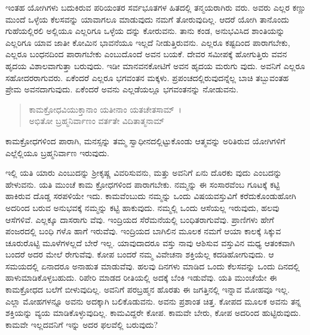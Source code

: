 ಇಂತಹ ಯೋಗಿಗಳು ಬದುಕಿರುವ ಪರಿಯಂತರ ಸರ್ವಭೂತಗಳ ಹಿತದಲ್ಲಿ ತನ್ಮಯರಾಗಿರು ವರು. ಅವರು ಎಲ್ಲರ ಕಣ್ಣು ಮುಂದೆ ಒಳ್ಳೆಯ ಕೆಲಸವನ್ನು ಯಾವಾಗಲೂ ಮಾಡುವುದು ನಮಗೆ ತೋರುವುದಿಲ್ಲ. ಆದರೆ ಯೋಗಿ ತಾನೊಂದು ಗುಹೆಯಲ್ಲಿರಲಿ ಅಲ್ಲಿಯೂ ಎಲ್ಲರಿಗೂ ಒಳ್ಳೆಯ ದನ್ನು ಕೋರುವನು. ತಾನು ಕಂಡ, ಅನುಭವಿಸಿದ ಶಾಂತಿಯನ್ನು ಎಲ್ಲರಿಗೂ ಯಾವ ಜಾತೀ ಕೋಮಿನ ಭಾವನೆಯೂ ಇಲ್ಲದೆ ನೀಡುತ್ತಿರುವನು. ಎಲ್ಲರೂ ಕಷ್ಟದಿಂದ ಪಾರಾಗಬೇಕು, ಎಲ್ಲರೂ ಬಂಧನದಿಂದ ಪಾರಾಗಬೇಕು ಎಂಬುದೊಂದೆ ಅವನ ಬಯಕೆ. ದೇವರ ಸಮೀಪಕ್ಕೆ ಹೋಗುತ್ತಿರು ವವನ ಹೃದಯ ವಿಶಾಲವಾಗುತ್ತಾ ಬರುವುದು. ಇಡೀ ಮಾನವನಕೋಟಿಗೆ ಅವನ ಹೃದಯ ಮರುಗು ವುದು. ಅವನಿಗೆ ಎಲ್ಲರೂ ಸಹೋದರರಾಗುವರು. ಏಕೆಂದರೆ ಎಲ್ಲರೂ ಭಗವಂತನ ಮಕ್ಕಳು. ಪ್ರಪಂಚದಲ್ಲಿರುವುದನ್ನೆಲ್ಲ ಬಾಚಿ ತಬ್ಬುವಂತಹ ಪ್ರೇಮ ಅವನದಾಗುವುದು. ಏಕೆಂದರೆ ಅವನು ಎಲ್ಲಡೆಯಲ್ಲೂ ಭಗವಂತನನ್ನು ನೋಡುವನು.

\begin{verse}
ಕಾಮಕ್ರೋಧವಿಯುಕ್ತಾನಾಂ ಯತೀನಾಂ ಯತಚೇತಸಾಮ್~।\\ಅಭಿತೋ ಬ್ರಹ್ಮನಿರ್ವಾಣಂ ವರ್ತತೇ ವಿದಿತಾತ್ಮನಾಮ್ 
\end{verse}

{\small ಕಾಮಕ್ರೋಧಗಳಿಂದ ಪಾರಾಗಿ, ಮನಸ್ಸನ್ನು ತಮ್ಮ ಸ್ವಾಧೀನದಲ್ಲಿಟ್ಟುಕೊಂಡು ಆತ್ಮವನ್ನು ಅರಿತಿರುವ ಯೋಗಿಗಳಿಗೆ ಎಲ್ಲೆಲ್ಲಿಯೂ ಬ್ರಹ್ಮನಿರ್ವಾಣ ಇರುವುದು.}

ಇಲ್ಲಿ ಯತಿ ಯಾರು ಎಂಬುದನ್ನು ಶ‍್ರೀಕೃಷ್ಣ ವಿವರಿಸುವನು, ಮತ್ತು ಅವನಿಗೆ ಏನು ದೊರಕು ವುದು ಎಂಬದನ್ನು ಹೇಳುವನು. ಯತಿ ಮುಂಚೆ ಕಾಮ ಕ್ರೋಧಗಳಿಂದ ಪಾರಾಗಬೇಕು. ನಮ್ಮನ್ನು ಈ ಸಂಸಾರವೆಂಬ ಗೂಟಕ್ಕೆ ಕಟ್ಟಿ ಹಾಕಿರುವ ದೊಡ್ಡ ಸರಪಳಿಯೇ ಇದು. ಕಾಮವೆಂಬುದು ನಮ್ಮನ್ನು ಒಂದು ವಿಷಯವಸ್ತುವಿಗೆ ಕರೆದುಕೊಂಡುಹೋಗಿ ಅದರಿಂದ ಬರುವ ಅನುಭವಕ್ಕೆ ನಮ್ಮನ್ನು ಕಟ್ಟಿ ಹಾಕುವುದು. ನಮ್ಮಲ್ಲಿ ಒಂದು ಆಸೆಯಲ್ಲ ಇರುವುದು, ಹಲವು ಆಸೆಗಳಿವೆ. ಎಲ್ಲಕ್ಕೂ ದಾಸರಾಗು ವೆವು. ಇಂದ್ರಿಯದ ಸೆರೆಮನೆಯಲ್ಲಿ ಬಂಧಿತರಾಗುವೆವು. ಪ್ರಾಣಿಗಳು ಹೇಗೆ ಪಂಜರದಲ್ಲಿ ಬಂಧಿ ಗಳೊ ಹಾಗೆ ಇರುವೆವು. ಇಂದ್ರಿಯದ ಬಾಗಿಲಿನ ಮೂಲಕ ನಮಗೆ ಆಯಾ ಕಾಲಕ್ಕೆ ಸಿಕ್ಕುವ ಚೂರುರೊಟ್ಟಿ ಮೂಳೆಗಳಲ್ಲದೆ ಬೇರೆ ಇಲ್ಲ. ಯಾವುದಾದರೂ ವಸ್ತು ನಾವು ಆಶಿಸುವ ವಸ್ತುವಿನ ಮಧ್ಯ ಆತಂಕವಾಗಿ ಬಂದರೆ ಅದರ ಮೇಲೆ ರೇಗುವೆವು. ಕೋಪ ಬಂದರೆ ನಮ್ಮ ವಿವೇಚನಾ ಶಕ್ತಿಯೆಲ್ಲ ಕದಡಿಹೋಗುವುದು. ಆ ಸಮಯದಲ್ಲಿ ಏನಾದರೂ ಅನಾಹುತ ಮಾಡುವೆವು. ಹಲವು ದಿನಗಳು ಮಾಡಿದ ಒಂದು ಕೆಲಸವನ್ನು ಒಂದು ದಿನದಲ್ಲಿ ಹಾಳುಮಾಡಿಕೊಳ್ಳಬಹುದು. ರಿಪೇರಿ ಮಾಡದ ರೀತಿಯಲ್ಲಿ ಅದಕ್ಕೆ ಬೆಂಕಿ ಇಡುವೆವು. ಯತಿ ಮುಂಚೆಯೇ ಈ ಕಾಮಕ್ರೋಧದ ಬಲೆಗೆ ಬೀಳುವುದಿಲ್ಲ. ಅವನಿಗೆ ಪರಬ್ರಹ್ಮನ ಹೊರತು ಈ ಜಗತ್ತಿನಲ್ಲಿ ಇನ್ನಾವ ಮೋಹವೂ ಇಲ್ಲ. ಎಲ್ಲಾ ಮೋಹಗಳನ್ನೂ ಅವನು ಅದಕ್ಕಾಗಿ ಬಲಿಕೊಡುವನು. ಅವನು ಪ್ರಶಾಂತ ಚಿತ್ತ. ಕೋಪದ ಮೂಲಕ ಅವನು ತನ್ನ ಶಕ್ತಿಯನ್ನು ವ್ಯಯ ಮಾಡಿಕೊಳ್ಳುವುದಿಲ್ಲ. ಕಾಮವಿದ್ದರೇ ಕೋಪ. ಕಾಮವೇ ಬೇರು, ಕೋಪ ಅದರಿಂದ ಹುಟ್ಟಿರುವುದು. ಕಾಮವೇ ಇಲ್ಲದವನಿಗೆ ಇನ್ನು ಅದರ ಫಲವೆಲ್ಲಿ ಬರುವುದು?

